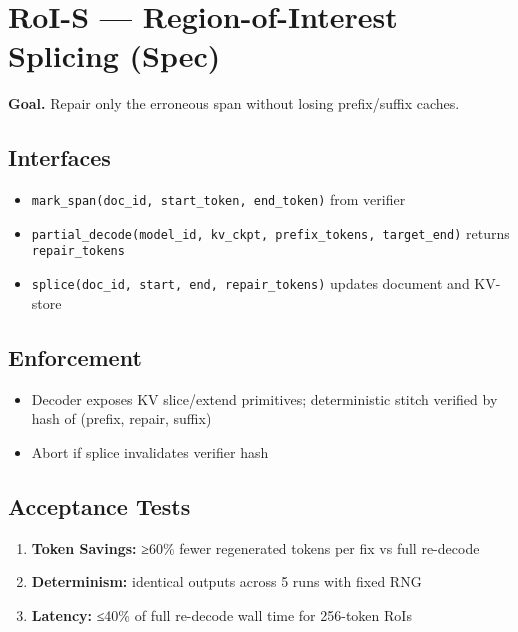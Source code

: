 \documentclass[
]{article}
\author{}
\date{}
\providecommand{\tightlist}{%
  \setlength{\itemsep}{0pt}\setlength{\parskip}{0pt}}
\begin{document}
\hypertarget{roi-s-region-of-interest-splicing-spec}{%
\section{RoI-S --- Region-of-Interest Splicing
(Spec)}\label{roi-s-region-of-interest-splicing-spec}}

\textbf{Goal.} Repair only the erroneous span without losing
prefix/suffix caches.

\hypertarget{interfaces}{%
\subsection{Interfaces}\label{interfaces}}

\begin{itemize}
\tightlist
\item
  \texttt{mark\_span(doc\_id,\ start\_token,\ end\_token)} from verifier
\item
  \texttt{partial\_decode(model\_id,\ kv\_ckpt,\ prefix\_tokens,\ target\_end)}
  returns \texttt{repair\_tokens}
\item
  \texttt{splice(doc\_id,\ start,\ end,\ repair\_tokens)} updates
  document and KV-store
\end{itemize}

\hypertarget{enforcement}{%
\subsection{Enforcement}\label{enforcement}}

\begin{itemize}
\tightlist
\item
  Decoder exposes KV slice/extend primitives; deterministic stitch
  verified by hash of (prefix, repair, suffix)
\item
  Abort if splice invalidates verifier hash
\end{itemize}

\hypertarget{acceptance-tests}{%
\subsection{Acceptance Tests}\label{acceptance-tests}}

\begin{enumerate}
\def\labelenumi{\arabic{enumi}.}
\tightlist
\item
  \textbf{Token Savings:} ≥60\% fewer regenerated tokens per fix vs full
  re-decode
\item
  \textbf{Determinism:} identical outputs across 5 runs with fixed RNG
\item
  \textbf{Latency:} ≤40\% of full re-decode wall time for 256-token RoIs
\end{enumerate}
\end{document}
